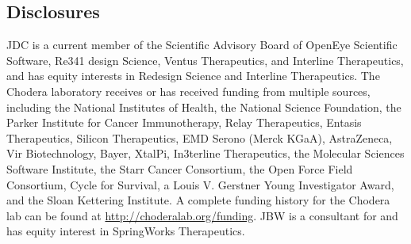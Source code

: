 \documentclass[9pt,lessons]{livecoms}
\begin{document}
\subsection{Disclosures}

JDC is a current member of the Scientific Advisory Board of OpenEye Scientific Software, Re341 design Science, Ventus Therapeutics, and Interline Therapeutics, and has equity interests in Redesign Science and Interline Therapeutics. The Chodera laboratory receives or has received funding from multiple sources, including the National Institutes of Health, the National Science Foundation, the Parker Institute for Cancer Immunotherapy, Relay Therapeutics, Entasis Therapeutics, Silicon Therapeutics, EMD Serono (Merck KGaA), AstraZeneca, Vir Biotechnology, Bayer, XtalPi, In3terline Therapeutics, the Molecular Sciences Software Institute, the Starr Cancer Consortium, the Open Force Field Consortium, Cycle for Survival, a Louis V. Gerstner Young Investigator Award, and the Sloan Kettering Institute. A complete funding history for the Chodera lab can be found at
\url{http://choderalab.org/funding}. JBW is a consultant for and has equity interest in SpringWorks Therapeutics.



\nolinenumbers %

\linenumbers


\appendix
\end{document}
